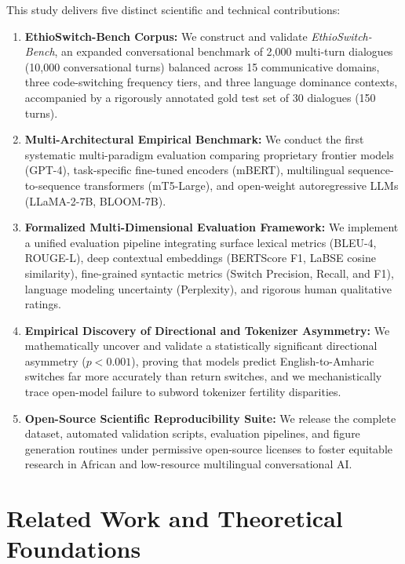 \documentclass[11pt,a4paper]{article}
\begin{document}
This study delivers five distinct scientific and technical contributions:
\begin{enumerate}
    \item \textbf{EthioSwitch-Bench Corpus:} We construct and validate \textit{EthioSwitch-Bench}, an expanded conversational benchmark of 2,000 multi-turn dialogues (10,000 conversational turns) balanced across 15 communicative domains, three code-switching frequency tiers, and three language dominance contexts, accompanied by a rigorously annotated gold test set of 30 dialogues (150 turns).
    \item \textbf{Multi-Architectural Empirical Benchmark:} We conduct the first systematic multi-paradigm evaluation comparing proprietary frontier models (GPT-4), task-specific fine-tuned encoders (mBERT), multilingual sequence-to-sequence transformers (mT5-Large), and open-weight autoregressive LLMs (LLaMA-2-7B, BLOOM-7B).
    \item \textbf{Formalized Multi-Dimensional Evaluation Framework:} We implement a unified evaluation pipeline integrating surface lexical metrics (BLEU-4, ROUGE-L), deep contextual embeddings (BERTScore F1, LaBSE cosine similarity), fine-grained syntactic metrics (Switch Precision, Recall, and F1), language modeling uncertainty (Perplexity), and rigorous human qualitative ratings.
    \item \textbf{Empirical Discovery of Directional and Tokenizer Asymmetry:} We mathematically uncover and validate a statistically significant directional asymmetry ($p < 0.001$), proving that models predict English-to-Amharic switches far more accurately than return switches, and we mechanistically trace open-model failure to subword tokenizer fertility disparities.
    \item \textbf{Open-Source Scientific Reproducibility Suite:} We release the complete dataset, automated validation scripts, evaluation pipelines, and figure generation routines under permissive open-source licenses to foster equitable research in African and low-resource multilingual conversational AI.
\end{enumerate}

\section{Related Work and Theoretical Foundations}
\end{document}
